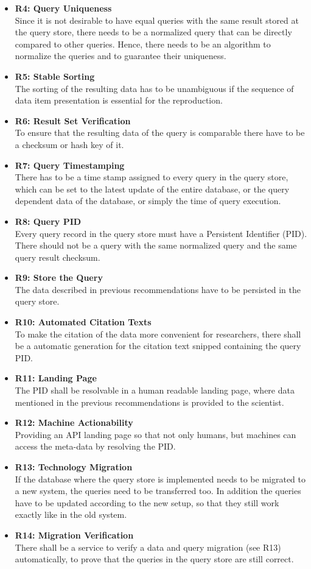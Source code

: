 \documentclass[draft,final]{vutinfth} %
\begin{document}
\begin{itemize}
\begin{itemize}
	\end{itemize}
	\item \textbf{R4: Query Uniqueness} \\
	Since it is not desirable to have equal queries with the same result stored at the query store, there needs to be a normalized query that can be directly compared to other queries. Hence, there needs to be an algorithm to normalize the queries and to guarantee their uniqueness.
	\item \textbf{R5: Stable Sorting} \\
	The sorting of the resulting data has to be unambiguous if the sequence of data item presentation is essential for the reproduction.
	\item \textbf{R6: Result Set Verification} \\
	To ensure that the resulting data of the query is comparable there have to be a checksum or hash key of it. 
	\item \textbf{R7: Query Timestamping} \\
	There has to be a time stamp assigned to every query in the query store, which can be set to the latest update of the entire database, or the query dependent data of the database, or simply the time of query execution.
	\item \textbf{R8: Query PID}\\
	Every query record in the query store must have a Persistent Identifier (PID). There should not be a query with the same normalized query and the same query result checksum. 
	\item \textbf{R9: Store the Query} \\
	The data described in previous recommendations have to be persisted in the query store.
	\item \textbf{R10: Automated Citation Texts} \\
	To make the citation of the data more convenient for researchers, there shall be a automatic generation for the citation text snipped containing the query PID.
	\item \textbf{R11: Landing Page} \\
	The PID shall be resolvable in a human readable landing page, where data mentioned in the previous recommendations is provided to the scientist.
	\item \textbf{R12: Machine Actionability} \\
	Providing an API landing page so that not only humans, but machines can access the meta-data by resolving the PID.
	\item \textbf{R13: Technology Migration} \\
	If the database where the query store is implemented needs to be migrated to a new system, the queries need to be transferred too. In addition the queries have to be updated according to the new setup, so that they still work exactly like in the old system.
	\item \textbf{R14: Migration Verification} \\
	There shall be a service to verify a data and query migration (see R13) automatically, to prove that the queries in the query store are still correct. 
\end{itemize}
\end{document}

